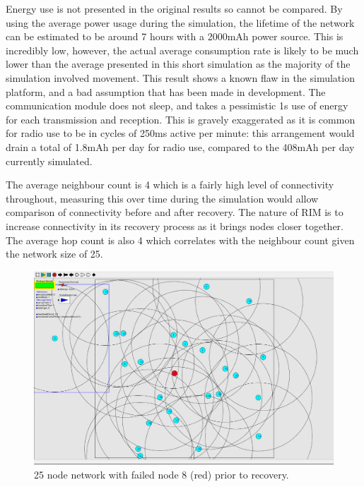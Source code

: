 \documentclass[authoryearcitations]{UoYCSproject}
\begin{document}
Energy use is not presented in the original results so cannot be compared. By using the average power usage during the simulation, the lifetime of the network can be estimated to be around 7 hours with a 2000mAh power source. This is incredibly low, however, the actual average consumption rate is likely to be much lower than the average presented in this short simulation as the majority of the simulation involved movement. This result shows a known flaw in the simulation platform, and a bad assumption that has been made in development. The communication module does not sleep, and takes a pessimistic 1s use of energy for each transmission and reception. This is gravely exaggerated as it is common for radio use to be in cycles of 250ms active per minute: this arrangement would drain a total of 1.8mAh per day for radio use, compared to the 408mAh per day currently simulated.

The average neighbour count is 4 which is a fairly high level of connectivity throughout, measuring this over time during the simulation would allow comparison of connectivity before and after recovery. The nature of RIM is to increase connectivity in its recovery process as it brings nodes closer together. The average hop count is also 4 which correlates with the neighbour count given the network size of 25.

\begin{figure}
 \centering
    \includegraphics[width=\textwidth]{figures/singlenodePrior.png}
    \caption{25 node network with failed node 8 (red) prior to recovery.}
    \label{fig:singlenodePrior}
\end{figure}
\end{document}
